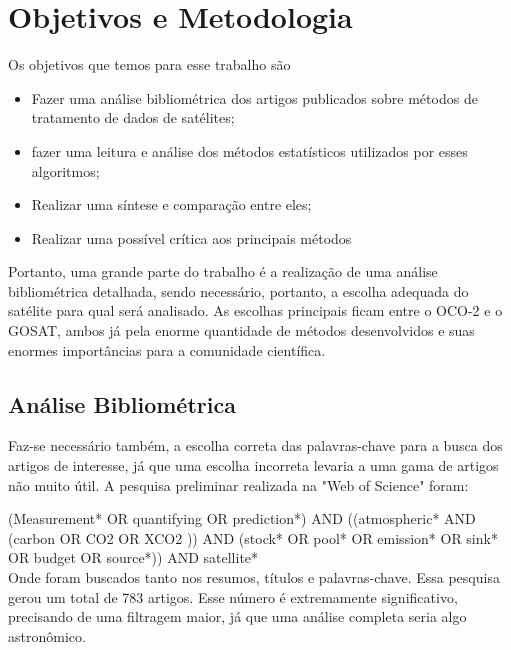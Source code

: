 \documentclass[12pt,a4paper]{article}
\begin{document}
\section{Objetivos e Metodologia}

Os objetivos que temos para esse trabalho são
\begin{itemize}
	\item Fazer uma análise bibliométrica dos artigos publicados sobre métodos de tratamento de dados de satélites;
	\item fazer uma leitura e análise dos métodos estatísticos utilizados por esses algoritmos;
	\item Realizar uma síntese e comparação entre eles;
	\item Realizar uma possível crítica aos principais métodos
\end{itemize}

Portanto, uma grande parte do trabalho é a realização de uma análise bibliométrica detalhada, sendo necessário, portanto, a escolha adequada do satélite para qual será analisado. As escolhas principais ficam entre o OCO-2 e o GOSAT, ambos já pela enorme quantidade de métodos desenvolvidos e suas enormes importâncias para a comunidade científica. \par

\subsection{Análise Bibliométrica}
Faz-se necessário também, a escolha correta das palavras-chave para a busca dos artigos de interesse, já que uma escolha incorreta levaria a uma gama de artigos não muito útil. A pesquisa preliminar realizada na "Web of Science" foram:

(Measurement* OR quantifying OR prediction*) AND ((atmospheric* AND (carbon OR CO2 OR XCO2 )) AND
(stock* OR pool* OR emission* OR sink* OR budget OR  source*)) AND satellite* \\

Onde foram buscados tanto nos resumos, títulos e palavras-chave. Essa pesquisa gerou um total de 783 artigos. Esse número é extremamente significativo, precisando de uma filtragem maior, já que uma análise completa seria algo astronômico. \par
\end{document}
